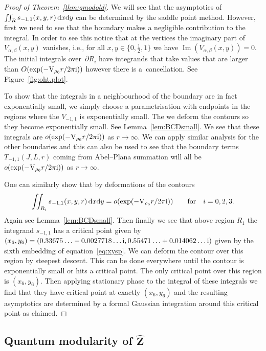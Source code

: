 \documentclass[pdftex]{sigma}
\numberwithin{equation}{section}
\def\VC{\mathrm{VC}}
\def\Im{\operatorname{Im}}
\def\VC{\mathrm{V}}
\begin{document}
\begin{proof}[Proof of Theorem~\ref{thm:qmodold}]
We will see that the asymptotics of $\int\!\!\int_R s_{-1,1}(x,y,r)\,{\rm d}x{\rm d}y$ can be determined by the saddle point method. However, first we need to see that the boundary makes a negligible contribution to the integral. In order to see this notice that at the vertices the imaginary part of $V_{\alpha,\beta}(x,y)$ vanishes, i.e., for all $x,y\in\{0,\tfrac{1}{2},1\}$ we have $\Im(V_{\alpha,\beta}(x,y))=0$. The initial integrals over~$\partial R_i$ have integrands that take values that are larger than $O(\exp(-\VC_{\rho_6} r/2\pi {\rm i}))$ however there is a~cancellation. See Figure~\ref{fig:oht.plot}.

To show that the integrals in a neighbourhood of the boundary are in fact exponentially small, we simply choose a parametrisation with endpoints in the regions where the $V_{-1,1}$ is exponentially small. The we deform the contours so they become exponentially small. See Lemma~\ref{lem:BCDsmall}.
We see that these integrals are $o(\exp(-\VC_{\rho_6} r/2\pi {\rm i}))$ as $r\rightarrow\infty$. We can apply similar analysis for the other boundaries and this can also be used to see that the boundary terms $T_{-1,1}(J,L,r)$ coming from Abel--Plana summation will all be $o(\exp(-\VC_{\rho_6} r/2\pi {\rm i}))$ as $r\rightarrow\infty$.



One can similarly show that by deformations of the contours
\[
 \iint_{R_i} s_{-1,1}(x,y,r)\,{\rm d}x{\rm d}y
  =o(\exp(-\VC_{\rho_6} r/2\pi {\rm i}))
 \qquad\text{for}\quad
 i =0,2,3 .
\]
Again see Lemma~\ref{lem:BCDsmall}.
Then finally we see that above region $R_{1}$ the integrand $s_{-1,1}$ has a critical point given by
$(x_6,y_6)
=(0.33675\ldots - 0.0027718\dots {\rm i},
0.55471\ldots + 0.014062\dots {\rm i})$
given by the sixth embedding of equation~\eqref{eq:xysp}.
We can deform the contour over this region by steepest descent.
This can be done everywhere until the contour is exponentially small or hits a critical point. The only critical point over this region is $(x_6,y_6)$.
Then applying stationary phase to the integral of these integrals we find that they have critical point at exactly $(x_6,y_6)$ and the resulting asymptotics are determined by a formal Gaussian integration around this critical point as claimed.
\end{proof}

\subsection[Quantum modularity of $\widehat{Z}$]{Quantum modularity of $\boldsymbol{\widehat{Z}}$}
\end{document}
